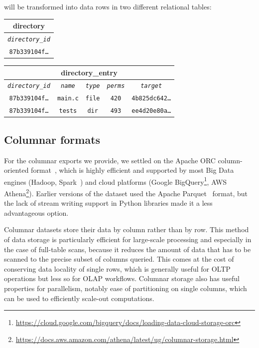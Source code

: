 will be transformed into data rows in two different relational tables:

\vspace{1em}

\begin{center}
\begin{tabular}{|c|}
    \multicolumn{1}{c}{\textbf{directory}} \\ \hline
    \emph{\texttt{directory\_id}} \\ \hline
    \texttt{87b339104f\ldots} \\ \hline
\end{tabular}
\qquad
\begin{tabular}{|c|c|c|c|c|}
    \multicolumn{5}{c}{\textbf{directory\_entry}} \\ \hline
    \emph{\texttt{directory\_id}} & \emph{\texttt{name}} & \emph{\texttt{type}}
                                  & \emph{\texttt{perms}} &
                                  \emph{\texttt{target}} \\ \hline
    \texttt{87b339104f\ldots} & \texttt{main.c} & \texttt{file} & \texttt{420}
                              & \texttt{4b825dc642\ldots} \\ \hline
    \texttt{87b339104f\ldots} & \texttt{tests} & \texttt{dir} & \texttt{493}
                              & \texttt{ee4d20e80a\ldots} \\ \hline
\end{tabular}
\end{center}

\subsection{Columnar formats}
For the columnar exports we provide, we settled on the Apache ORC
column-oriented format~\cite{huai2014orc}, which is highly efficient and
supported by most Big Data engines (Hadoop, Spark~\cite{zaharia2016apache}) and
cloud platforms (Google
BigQuery\footnote{\url{https://cloud.google.com/bigquery/docs/loading-data-cloud-storage-orc}},
AWS
Athena\footnote{\url{https://docs.aws.amazon.com/athena/latest/ug/columnar-storage.html}}).
Earlier versions of the dataset used the Apache
Parquet~\cite{twitter2013parquet,website-apache-parquet} format, but the lack
of stream writing support in Python libraries made it a less advantageous
option.

Columnar datasets store their data by column rather than by row. This method of
data storage is particularly efficient for large-scale processing and
especially in the case of full-table scans, because it reduces the amount of
data that has to be scanned to the precise subset of columns queried. This
comes at the cost of conserving data locality of single rows, which is
generally useful for \gls{OLTP} operations but less so for \gls{OLAP}
workflows. Columnar storage also has useful properties for parallelism, notably
ease of partitioning on single columns, which can be used to efficiently
scale-out computations.

